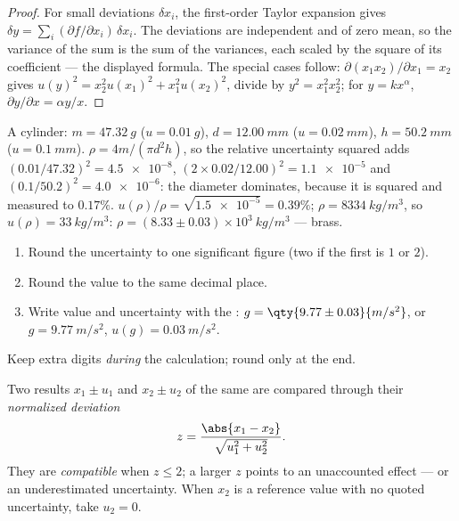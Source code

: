 \begin{proof}
For small deviations $\delta x_i$, the first-order Taylor expansion
gives $\delta y = \sum_i (\partial f/\partial x_i)\,\delta x_i$. The
deviations are independent and of zero mean, so the variance of the sum
is the sum of the variances, each scaled by the square of its
coefficient --- the displayed formula. The special cases follow:
$\partial(x_1 x_2)/\partial x_1 = x_2$ gives
$u(y)^2 = x_2^2 u(x_1)^2 + x_1^2 u(x_2)^2$, divide by $y^2 = x_1^2 x_2^2$;
for $y = kx^\alpha$, $\partial y/\partial x = \alpha y/x$.
\end{proof}

\begin{example}\label{ex:b1:units-dimensions:density}
A cylinder: $m = \qty{47.32}{g}$ ($u = \qty{0.01}{g}$),
$d = \qty{12.00}{mm}$ ($u = \qty{0.02}{mm}$), $h = \qty{50.2}{mm}$
($u = \qty{0.1}{mm}$). $\rho = 4m/(\pi d^2 h)$, so the relative
uncertainty squared adds $(0.01/47.32)^2 = \num{4.5e-8}$,
$(2 \times 0.02/12.00)^2 = \num{1.1e-5}$ and
$(0.1/50.2)^2 = \num{4.0e-6}$: the diameter dominates, because it is
squared and measured to $0.17\%$. $u(\rho)/\rho = \sqrt{\num{1.5e-5}}
= 0.39\%$; $\rho = \qty{8334}{kg/m^3}$, so $u(\rho) = \qty{33}{kg/m^3}$:
$\rho = (8.33 \pm 0.03)\times10^3\ \unit{kg/m^3}$ --- brass.
\end{example}

\begin{method}\label{met:b1:units-dimensions:writing}
\begin{enumerate}
  \item Round the uncertainty to one significant figure (two if the
        first is $1$ or $2$).
  \item Round the value to the same decimal place.
  \item Write value and uncertainty with the :
        $g = \qty{9.77\pm0.03}{m/s^2}$, or $g = \qty{9.77}{m/s^2}$,
        $u(g) = \qty{0.03}{m/s^2}$.
\end{enumerate}
Keep extra digits \emph{during} the calculation; round only at the end.
\end{method}

\begin{definition}\label{def:b1:units-dimensions:zscore}
Two results $x_1 \pm u_1$ and $x_2 \pm u_2$ of the same  are
compared through their \emph{normalized deviation}
\[
z = \frac{\abs{x_1 - x_2}}{\sqrt{u_1^2 + u_2^2}} .
\]
They are \emph{compatible} when $z \leq 2$; a larger $z$ points to an
unaccounted effect --- or an underestimated uncertainty. When $x_2$ is
a reference value with no quoted uncertainty, take $u_2 = 0$.
\end{definition}

